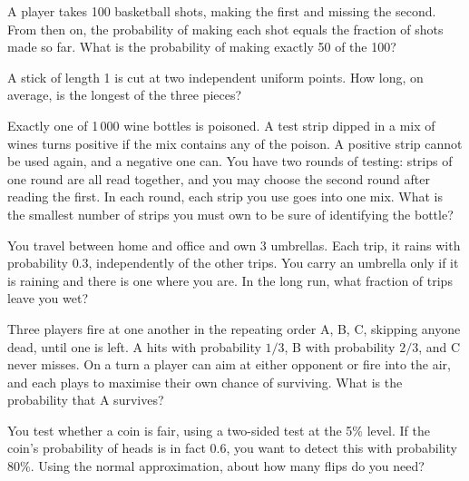 \begin{question}\label{iq:iv1:timed-test-1:7}
A player takes 100 basketball shots, making the first and missing the second. From then on, the probability of making each shot equals the fraction of shots made so far. What is the probability of making exactly 50 of the 100?
\end{question}

\begin{question}\label{iq:iv1:timed-test-1:8}
A stick of length 1 is cut at two independent uniform points. How long, on average, is the longest of the three pieces?
\end{question}

\begin{question}\label{iq:iv1:timed-test-1:9}
Exactly one of 1\,000 wine bottles is poisoned. A test strip dipped in a mix of wines turns positive if the mix contains any of the poison. A positive strip cannot be used again, and a negative one can. You have two rounds of testing: strips of one round are all read together, and you may choose the second round after reading the first. In each round, each strip you use goes into one mix. What is the smallest number of strips you must own to be sure of identifying the bottle?
\end{question}

\begin{question}\label{iq:iv1:timed-test-1:10}
You travel between home and office and own 3 umbrellas. Each trip, it rains with probability $0.3$, independently of the other trips. You carry an umbrella only if it is raining and there is one where you are. In the long run, what fraction of trips leave you wet?
\end{question}

\begin{question}\label{iq:iv1:timed-test-1:11}
Three players fire at one another in the repeating order A, B, C, skipping anyone dead, until one is left. A hits with probability $1/3$, B with probability $2/3$, and C never misses. On a turn a player can aim at either opponent or fire into the air, and each plays to maximise their own chance of surviving. What is the probability that A survives?
\end{question}

\begin{question}\label{iq:iv1:timed-test-1:12}
You test whether a coin is fair, using a two-sided test at the 5\% level. If the coin's probability of heads is in fact $0.6$, you want to detect this with probability 80\%. Using the normal approximation, about how many flips do you need?
\end{question}
